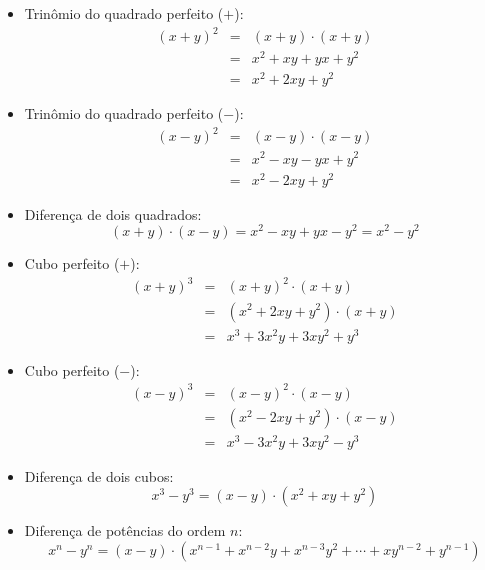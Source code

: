  \begin{itemize}
  \item Trinômio do quadrado perfeito ($+$): 
\begin{eqnarray*}
(x + y)^2&=& (x+y) \cdot (x+y)\\
         &=& x^2 + xy + yx + y^2 \\
         &=& x^2 + 2xy + y^2
\end{eqnarray*}

  \item Trinômio do quadrado perfeito ($-$): 
\begin{eqnarray*}
(x - y)^2&=& (x - y) \cdot (x - y) \\
         &=& x^2 - xy - yx + y^2 \\
         &=& x^2 - 2xy + y^2
\end{eqnarray*}

  \item Diferença de dois quadrados: 
\begin{equation*}
(x + y) \cdot (x - y)= x^2 - xy + yx - y^2 = x^2 - y^2
\end{equation*}

  \item Cubo perfeito ($+$): 
\begin{eqnarray*}
(x+y)^3&=& (x+y)^2 \cdot (x+y) \\
       &=& (x^2 + 2xy + y^2) \cdot (x+y) \\
       &=& x^3 + 3x^2y + 3xy^2 + y^3
\end{eqnarray*}

  \item Cubo perfeito ($-$): 
\begin{eqnarray*}
(x-y)^3&=& (x-y)^2 \cdot (x-y) \\
       &=& (x^2 - 2xy + y^2) \cdot (x-y) \\
       &=& x^3 - 3x^2y + 3xy^2 - y^3
\end{eqnarray*}

  \item Diferença de dois cubos:
\begin{equation*}
x^3 - y^3= (x-y) \cdot (x^2 + xy + y^2)
\end{equation*}

\item Diferença de potências do ordem $n$:
\begin{equation*}
x^n - y^n= (x-y) \cdot (x^{n-1} + x^{n-2}y + x^{n-3}y^2 + \cdots + xy^{n-2} + y^{n-1})
\end{equation*}
 \end{itemize}
 
